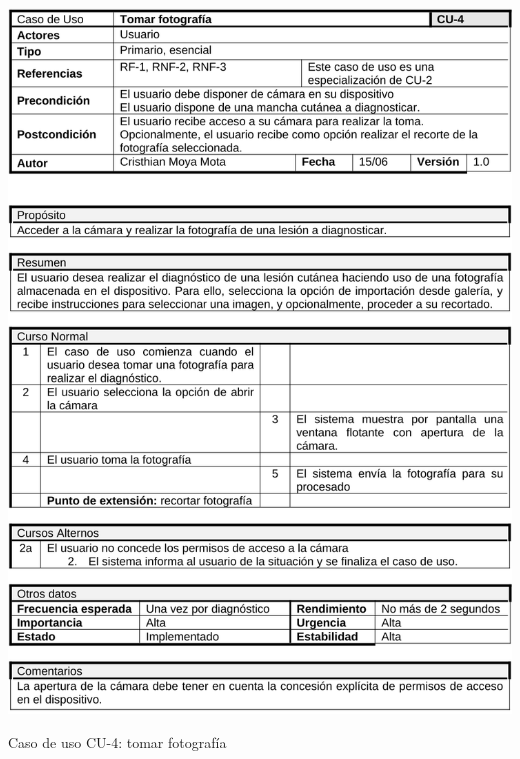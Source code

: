   \begin{table}[H]
	\centering
	\includegraphics[scale=0.45]{imagenes/cu-4.png}
	\caption{Caso de uso CU-4: tomar fotografía}
	\label{fig:cu4}
\end{table}

